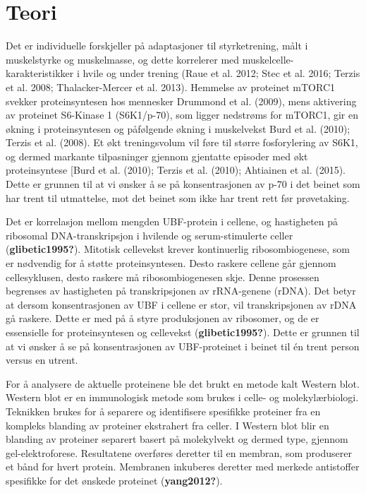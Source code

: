 \documentclass[
  letterpaper,
  DIV=11,
  numbers=noendperiod]{scrreprt}
\begin{document}
\hypertarget{teori}{%
\section{\texorpdfstring{\textbf{Teori}}{Teori}}\label{teori}}

Det er individuelle forskjeller på adaptasjoner til styrketrening, målt
i muskelstyrke og muskelmasse, og dette korrelerer med
muskelcelle-karakteristikker i hvile og under trening (Raue et al. 2012;
Stec et al. 2016; Terzis et al. 2008; Thalacker-Mercer et al. 2013).
Hemmelse av proteinet mTORC1 svekker proteinsyntesen hos mennesker
Drummond et al. (2009), mens aktivering av proteinet S6-Kinase 1
(S6K1/p-70), som ligger nedstrøms for mTORC1, gir en økning i
proteinsyntesen og påfølgende økning i muskelvekst Burd et al. (2010);
Terzis et al. (2008). Et økt treningsvolum vil føre til større
fosforylering av S6K1, og dermed markante tilpasninger gjennom gjentatte
episoder med økt proteinsyntese {[}Burd et al. (2010); Terzis et al.
(2010); Ahtiainen et al. (2015). Dette er grunnen til at vi ønsker å se
på konsentrasjonen av p-70 i det beinet som har trent til utmattelse,
mot det beinet som ikke har trent rett før prøvetaking.

Det er korrelasjon mellom mengden UBF-protein i cellene, og hastigheten
på ribosomal DNA-transkripsjon i hvilende og serum-stimulerte celler
(\textbf{glibetic1995?}). Mitotisk cellevekst krever kontinuerlig
ribosombiogenese, som er nødvendig for å støtte proteinsyntesen. Desto
raskere cellene går gjennom cellesyklusen, desto raskere må
ribosombiogenesen skje. Denne prosessen begrenses av hastigheten på
transkripsjonen av rRNA-genene (rDNA). Det betyr at dersom
konsentrasjonen av UBF i cellene er stor, vil transkripsjonen av rDNA gå
raskere. Dette er med på å styre produksjonen av ribosomer, og de er
essensielle for proteinsyntesen og cellevekst (\textbf{glibetic1995?}).
Dette er grunnen til at vi ønsker å se på konsentrasjonen av
UBF-proteinet i beinet til én trent person versus en utrent.

For å analysere de aktuelle proteinene ble det brukt en metode kalt
Western blot. Western blot er en immunologisk metode som brukes i celle-
og molekylærbiologi. Teknikken brukes for å separere og identifisere
spesifikke proteiner fra en kompleks blanding av proteiner ekstrahert
fra celler. I Western blot blir en blanding av proteiner separert basert
på molekylvekt og dermed type, gjennom gel-elektroforese. Resultatene
overføres deretter til en membran, som produserer et bånd for hvert
protein. Membranen inkuberes deretter med merkede antistoffer spesifikke
for det ønskede proteinet (\textbf{yang2012?}).
\end{document}
